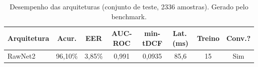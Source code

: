 \begin{table}[H]
\centering
\caption{Desempenho das arquiteturas (conjunto de teste, 2336 amostras). Gerado pelo benchmark.}
\label{tab:bench_resultados}
\small\singlespacing
\begin{tabular}{lccccccc}
\toprule
\textbf{Arquitetura} & \textbf{Acur.} & \textbf{EER} & \textbf{AUC-ROC} & \textbf{min-tDCF} & \textbf{Lat.\,(ms)} & \textbf{Treino} & \textbf{Conv.?} \\
\midrule
RawNet2 & 96,10\% & 3,85\% & 0,991 & 0,0935 & 85,6 & 15 & \textcolor{successgreen}{Sim} \\
\bottomrule
\end{tabular}
\end{table}
